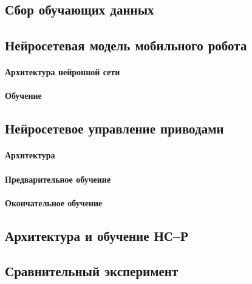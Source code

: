 \subsection{Сбор обучающих данных}



\subsection{Нейросетевая модель мобильного робота}

\paragraph{Архитектура нейронной сети}
\paragraph{Обучение}

\subsection{Нейросетевое управление приводами}
\paragraph{Архитектура}
\paragraph{Предварительное обучение}
\paragraph{Окончательное обучение}

\subsection{Архитектура и обучение НС--Р}

\subsection{Сравнительный эксперимент}

